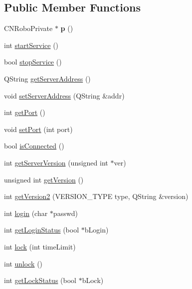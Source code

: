 \subsection*{Public Member Functions}
\begin{DoxyCompactItemize}
\item 
\hypertarget{classCNRobo_a54d73409c70775c333d5a27b61c0a4e7}{C\-N\-Robo\-Private $\ast$ {\bfseries p} ()}\label{classCNRobo_a54d73409c70775c333d5a27b61c0a4e7}

\item 
int \hyperlink{classCNRobo_a475b5b3e449c5d5652c0c19d340305ac}{start\-Service} ()
\item 
bool \hyperlink{classCNRobo_a748f21505ec3529faf7f75d1a8c5a237}{stop\-Service} ()
\item 
Q\-String \hyperlink{classCNRobo_ae30dd49e1038cce925c9371a1f1fd393}{get\-Server\-Address} ()
\item 
void \hyperlink{classCNRobo_a95342f1772d55ae837542e5f75f3b7ac}{set\-Server\-Address} (Q\-String \&addr)
\item 
int \hyperlink{classCNRobo_a8fef62cd7d9c91a4ef2417955c3abf26}{get\-Port} ()
\item 
void \hyperlink{classCNRobo_a59bf5ce91eb3379a74195a2f35a658e1}{set\-Port} (int port)
\item 
bool \hyperlink{classCNRobo_ad45e4a5f3cb80878ae1457cad3e1b762}{is\-Connected} ()
\item 
int \hyperlink{classCNRobo_a4694f8bed235efc901a3121ab9f3e4ee}{get\-Server\-Version} (unsigned int $\ast$ver)
\item 
unsigned int \hyperlink{classCNRobo_aa35b5ad889c3bd3b4e2ae8452c4fc0f7}{get\-Version} ()
\item 
int \hyperlink{classCNRobo_ac8245fe022f392d644306443d394f918}{get\-Version2} (V\-E\-R\-S\-I\-O\-N\-\_\-\-T\-Y\-P\-E type, Q\-String \&version)
\item 
int \hyperlink{classCNRobo_acf8cf091b8d7f8cf5ec25057e80d5044}{login} (char $\ast$passwd)
\item 
int \hyperlink{classCNRobo_a2f88b4b7a6873efad102e8a393ccf2ef}{get\-Login\-Status} (bool $\ast$b\-Login)
\item 
int \hyperlink{classCNRobo_a88e0c6849478c47405e79e532426c776}{lock} (int time\-Limit)
\item 
int \hyperlink{classCNRobo_a499d243b701b84bc85717fcb8ad5e6d5}{unlock} ()
\item 
int \hyperlink{classCNRobo_aa90005f36dcb89bc0c35c199d585cc54}{get\-Lock\-Status} (bool $\ast$b\-Lock)

\end{DoxyCompactItemize}
